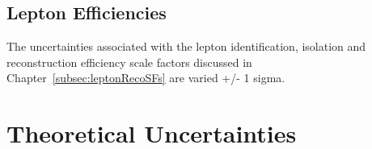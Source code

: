 \subsection{Lepton Efficiencies}
The uncertainties associated with the lepton identification, isolation and reconstruction efficiency scale factors discussed in Chapter~\ref{subsec:leptonRecoSFs} are varied +/- 1 sigma.


%
%

\section{Theoretical Uncertainties}\label{sec:theorySysts}

